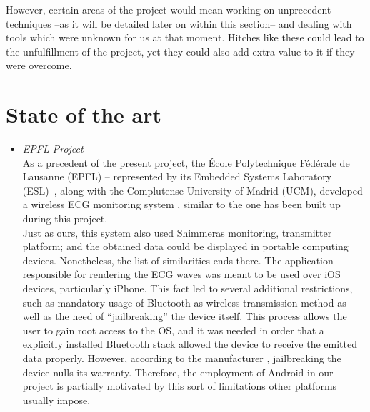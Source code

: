 		However, certain areas of the project would mean working on unprecedent techniques
		--as it will be detailed later on within this section-- and dealing with tools
		which were unknown for us at that moment. Hitches like these could lead to the
		unfulfillment of the project, yet they could also add extra value to it if 
		they were overcome.\\
		
	\section{State of the art}
		\begin{itemize}


			\item \emph{EPFL Project}\\
				As a precedent of the present project, the École Polytechnique Fédérale de Lausanne (EPFL) --
				represented by its Embedded Systems Laboratory (ESL)--, along with the Complutense University 
				of Madrid (UCM), developed a wireless ECG monitoring system \cite{ESL}, similar to the one has been built 
				up during this project.\\

				Just as ours, this system also used Shimmer\texttrademark as monitoring, transmitter platform;
				and the obtained data could be displayed in portable computing devices.
				Nonetheless, the list of similarities ends there. The application responsible for rendering
				the ECG waves was meant to be used over iOS devices, particularly iPhone. This fact led to several
				additional restrictions, such as mandatory usage of Bluetooth as wireless transmission method as
				well as the need of ``jailbreaking'' the device itself. This process allows the user to gain root access to
				the OS, and it was needed in order that a explicitly installed Bluetooth stack allowed the device to 
				receive the emitted data properly. However, according to the manufacturer \cite{AppleJB}, jailbreaking 
				the device nulls its warranty. Therefore, the employment of Android in our project is partially motivated 
				by this sort of limitations other platforms usually impose.\\


\end{itemize}
